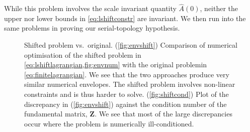 \documentclass[12pt]{article}
\newenvironment{myenuma}{\begin{inparaenum}[(a)]}{\end{inparaenum}}
\newcommand{\fundm}{Z}
\newcommand{\fund}{\mathbf{\fundm}}
\begin{document}
While this problem involves the scale invariant quantity \(\hat{A}(0)\), neither the upper nor lower bounds in \cref{eq:lshiftconstr} are invariant.
We then run into the same problems in proving our serial-topology hypothesis.

\begin{figure}[ht]
\begin{center}
\begin{myenuma}
  \item {}
  \label{fig:envshift}
  \item {}
  \label{fig:shiftcond}
\end{myenuma}
\caption[Shifted problem vs.\ original]{Shifted problem vs.\ original.
(\ref*{fig:envshift}) Comparison of numerical optimisation of the shifted problem in \cref{eq:lshiftlagrangian,fig:envnum} with the original problemin \cref{eq:finitelagrangian}.
We see that the two approaches produce very similar numerical envelopes.
The shifted problem involves non-linear constraints and is thus harder to solve.
(\ref{fig:shiftcond}) Plot of the discrepancy in (\ref*{fig:envshift}) against the condition number of the fundamental matrix, \(\fund \).
We see that most of the large discrepancies occur where the problem is numerically ill-conditioned.
\label{fig:shifted}}
\end{center}
\end{figure}
\end{document}
